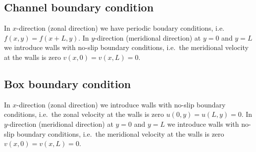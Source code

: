 \subsection{Channel boundary condition}
%
In $x$-direction (zonal direction) we have periodic boudary conditions, 
i.e.\ $f(x,y) = f(x+L,y)$. In $y$-direction (meridional direction) 
at $y=0$ and $y=L$ we introduce walls with no-slip boundary conditions, 
i.e.\ the meridional velocity at the walls is zero $v(x,0) = v(x,L) =  0$.

%
\subsection{Box boundary condition}
%
In $x$-direction (zonal direction) we introduce walls with no-slip boundary
conditions, i.e.\ the zonal velocity at the walls is zero 
$u(0,y) = u(L,y) = 0$. In $y$-direction (meridional direction) 
at $y=0$ and $y=L$ we introduce walls with no-slip boundary conditions, 
i.e.\ the meridional velocity at the walls is zero $v(x,0) = v(x,L) =  0$.

